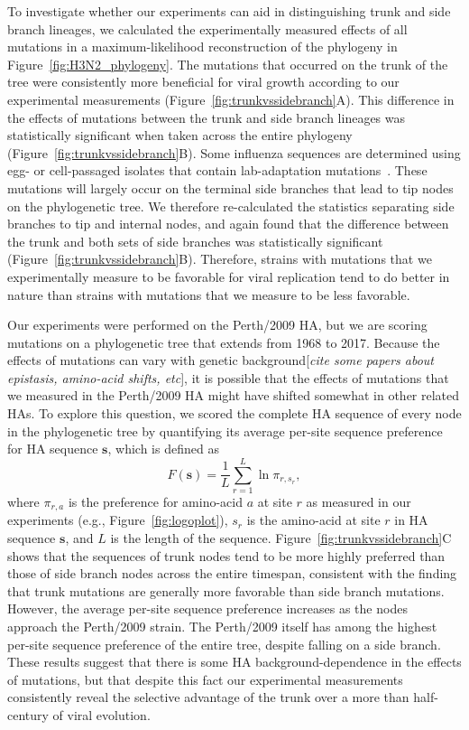\documentclass[9pt,twocolumn,twoside]{pnas-new}
\newcommand{\comment}[1]{{\color{red}[\textsl{#1}]}}
\begin{document}
To investigate whether our experiments can aid in distinguishing trunk and side branch lineages, we calculated the experimentally measured effects of all mutations in a maximum-likelihood reconstruction of the phylogeny in Figure~\ref{fig:H3N2_phylogeny}.
The mutations that occurred on the trunk of the tree were consistently more beneficial for viral growth according to our experimental measurements (Figure~\ref{fig:trunkvssidebranch}A).
This difference in the effects of mutations between the trunk and side branch lineages was statistically significant when taken across the entire phylogeny (Figure~\ref{fig:trunkvssidebranch}B).
Some influenza sequences are determined using egg- or cell-passaged isolates that contain lab-adaptation mutations~\citep{wu2017structural,mcwhite2016sequence,skowronski2016mutations}.
These mutations will largely occur on the terminal side branches that lead to tip nodes on the phylogenetic tree.
We therefore re-calculated the statistics separating side branches to tip and internal nodes, and again found that the difference between the trunk and both sets of side branches was statistically significant (Figure~\ref{fig:trunkvssidebranch}B).
Therefore, strains with mutations that we experimentally measure to be favorable for viral replication tend to do better in nature than strains with mutations that we measure to be less favorable. 

Our experiments were performed on the Perth/2009 HA, but we are scoring mutations on a phylogenetic tree that extends from 1968 to 2017.
Because the effects of mutations can vary with genetic background\comment{cite some papers about epistasis, amino-acid shifts, etc}, it is possible that the effects of mutations that we measured in the Perth/2009 HA might have shifted somewhat in other related HAs.
To explore this question, we scored the complete HA sequence of every node in the phylogenetic tree by quantifying its average per-site sequence preference for HA sequence $\mathbf{s}$, which is defined as 
\begin{equation}
F\left(\mathbf{s}\right) = \frac{1}{L}\displaystyle\sum_{r=1}^L \ln \pi_{r, s_r},
\end{equation}
where $\pi_{r, a}$ is the preference for amino-acid $a$ at site $r$ as measured in our experiments (e.g., Figure~\ref{fig:logoplot}), $s_r$ is the amino-acid at site $r$ in HA sequence $\mathbf{s}$, and $L$ is the length of the sequence.
Figure~\ref{fig:trunkvssidebranch}C shows that the sequences of trunk nodes tend to be more highly preferred than those of side branch nodes across the entire timespan, consistent with the finding that trunk mutations are generally more favorable than side branch mutations. 
However, the average per-site sequence preference increases as the nodes approach the Perth/2009 strain.
The Perth/2009 itself has among the highest per-site sequence preference of the entire tree, despite falling on a side branch.
These results suggest that there is some HA background-dependence in the effects of mutations, but that despite this fact our experimental measurements consistently reveal the selective advantage of the trunk over a more than half-century of viral evolution.
\end{document}
